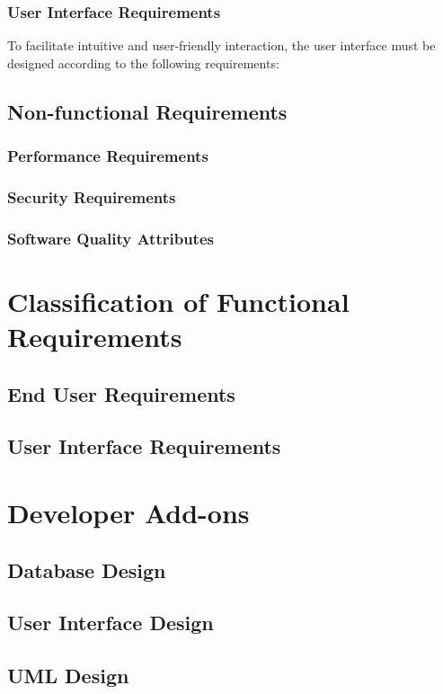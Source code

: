\documentclass[openany, oneside,11pt]{book}
\begin{document}
\subsection{User Interface Requirements}
To facilitate intuitive and user-friendly interaction, the user interface must be designed according to the following requirements:

\thispagestyle{fancy}
\section{Non-functional Requirements}

\subsection{Performance Requirements}
\subsection{Security Requirements}
\subsection{Software Quality Attributes}

\thispagestyle{fancy}
\chapter{Classification of Functional Requirements}
\section{End User Requirements}
\section{User Interface Requirements}

\thispagestyle{fancy}
\chapter{Developer Add-ons}
\section{Database Design}
\section{User Interface Design}
\section{UML Design}

\appendix
\end{document}
